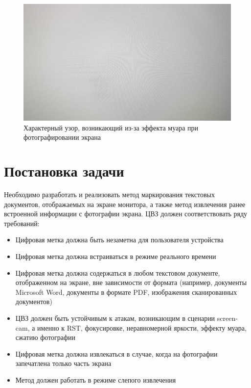 \documentclass[12pt,a4paper]{article}
\begin{document}
\begin{figure}[h]
	
	\centering
	
	\includegraphics[width=1.0\linewidth]{moire.jpg}
	
	\caption{Характерный узор, возникающий из-за эффекта муара при фотографировании экрана}
	
	\label{fig:moire}
	
\end{figure}

\newpage
\section{Постановка задачи}
Необходимо разработать и реализовать метод маркирования текстовых документов, отображаемых на экране монитора, а также метод извлечения ранее встроенной информации с фотографии экрана.
ЦВЗ должен соответствовать ряду требований:
\begin{itemize}
\item
Цифровая метка должна быть незаметна для пользователя устройства
\item
Цифровая метка должна встраиваться в режиме реального времени
\item
Цифровая метка должна содержаться в любом текстовом документе, отображенном  на экране, вне зависимости от формата (например, документы Microsoft Word, документы в формате PDF, изображения сканированных документов)
\item
ЦВЗ должен быть устойчивым к атакам, возникающим в сценарии screen-cam, а именно к RST, фокусировке, неравномерной яркости, эффекту муара, сжатию фотографии
\item
Цифровая метка должна извлекаться в случае, когда на фотографии запечатлена только часть экрана
\item
Метод должен работать в режиме слепого извлечения
\end{itemize}
\end{document}
